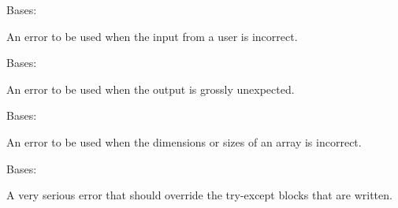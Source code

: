 \documentclass[letterpaper,10pt,english]{sphinxmanual}
\begin{document}

\begin{fulllineitems}
\label{\detokenize{Robustness.exception:Robustness.exception.InputError}}
Bases: 

An error to be used when the input from a user is incorrect.

\end{fulllineitems}


\begin{fulllineitems}
\label{\detokenize{Robustness.exception:Robustness.exception.OutputError}}
Bases: 

An error to be used when the output is grossly unexpected.

\end{fulllineitems}


\begin{fulllineitems}
\label{\detokenize{Robustness.exception:Robustness.exception.ShapeError}}
Bases: 

An error to be used when the dimensions or sizes of an array is incorrect.

\end{fulllineitems}


\begin{fulllineitems}
\label{\detokenize{Robustness.exception:Robustness.exception.TerminateError}}
Bases: 

A very serious error that should override the try-except blocks
that are written.

\end{fulllineitems}
\end{document}
